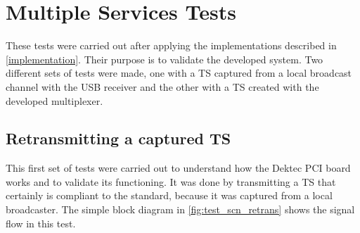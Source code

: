 \documentclass[
	12pt,				%
	openright,			%
	twoside,			%
	a4paper,			%
	brazil,
	french,				%
	english
	]{abntex2}
\begin{document}


\section{Multiple Services Tests}

These tests were carried out after applying the implementations described in \autoref{implementation}. Their purpose is to validate the developed system. Two different sets of tests were made, one with a TS captured from a local broadcast channel with the USB receiver and the other with a TS created with the developed multiplexer.

\subsection{Retransmitting a captured TS}
\label{retransmitting}

This first set of tests were carried out to understand how the Dektec PCI board works and to validate its functioning. It was done by transmitting a TS that certainly is compliant to the standard, because it was captured from a local broadcaster. The simple block diagram in \autoref{fig:test_scn_retrans} shows the signal flow in this test.
\end{document}
